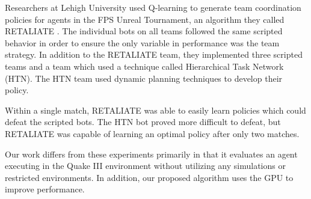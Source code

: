 Researchers at Lehigh University used Q-learning to generate team coordination policies for agents in the FPS Unreal Tournament, an algorithm they called RETALIATE \cite{retaliate}. The individual bots on all teams followed the same scripted behavior in order to ensure the only variable in performance was the team strategy. In addition to the RETALIATE team, they implemented three scripted teams and a team which used a technique called Hierarchical Task Network (HTN). The HTN team used dynamic planning techniques to develop their policy.

Within a single match, RETALIATE was able to easily learn policies which could defeat the scripted bots. The HTN bot proved more difficult to defeat, but RETALIATE was capable of learning an optimal policy after only two matches.

Our work differs from these experiments primarily in that it evaluates an agent executing in the Quake III environment without utilizing any simulations or restricted environments. In addition, our proposed algorithm uses the GPU to improve performance.